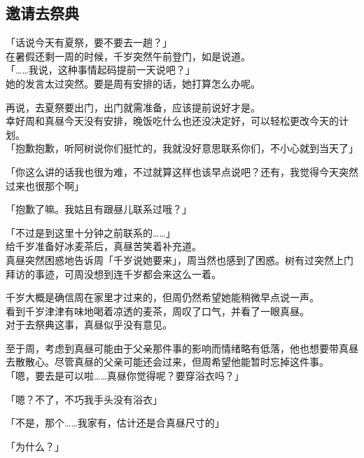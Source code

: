\subsection{邀请去祭典}

「话说今天有夏祭，要不要去一趟？」\\

在暑假还剩一周的时候，千岁突然午前登门，如是说道。\\

「……我说，这种事情起码提前一天说吧？」\\

她的发言太过突然。要是周有安排的话，她打算怎么办呢。

再说，去夏祭要出门，出门就需准备，应该提前说好才是。\\

幸好周和真昼今天没有安排，晚饭吃什么也还没决定好，可以轻松更改今天的计划。\\

「抱歉抱歉，听阿树说你们挺忙的，我就没好意思联系你们，不小心就到当天了」

「你这么讲的话我也很为难，不过就算这样也该早点说吧？还有，我觉得今天突然过来也很那个啊」

「抱歉了嘛。我姑且有跟昼儿联系过哦？」

「不过是到这里十分钟之前联系的……」\\

给千岁准备好冰麦茶后，真昼苦笑着补充道。\\

真昼突然困惑地告诉周「千岁说她要来」，周当然也感到了困惑。树有过突然上门拜访的事迹，可周没想到连千岁都会来这么一着。

千岁大概是确信周在家里才过来的，但周仍然希望她能稍微早点说一声。\\

看到千岁津津有味地喝着凉透的麦茶，周叹了口气，并看了一眼真昼。\\

对于去祭典这事，真昼似乎没有意见。

至于周，考虑到真昼可能由于父亲那件事的影响而情绪略有低落，他也想要带真昼去散散心。尽管真昼的父亲可能还会过来，但周希望他能暂时忘掉这件事。\\

「嗯，要去是可以啦……真昼你觉得呢？要穿浴衣吗？」

「嗯？不了，不巧我手头没有浴衣」

「不是，那个……我家有，估计还是合真昼尺寸的」

「为什么？」

